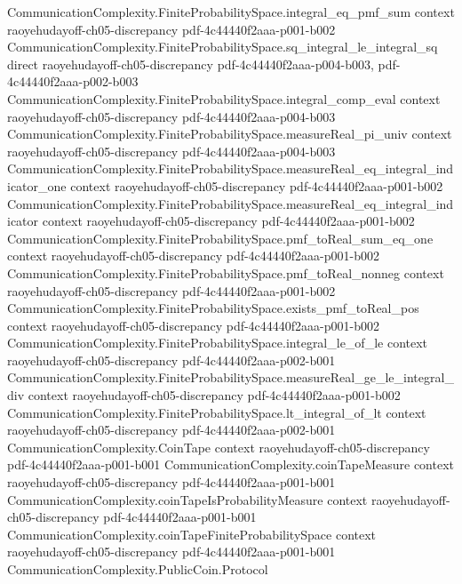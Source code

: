 \begin{lemma}
\proofstep
  {CommunicationComplexity.FiniteProbabilitySpace.integral_eq_pmf_sum}
  {context}
  {raoyehudayoff-ch05-discrepancy}
  {pdf-4c44440f2aaa-p001-b002}
\proofstep
  {CommunicationComplexity.FiniteProbabilitySpace.sq_integral_le_integral_sq}
  {direct}
  {raoyehudayoff-ch05-discrepancy}
  {pdf-4c44440f2aaa-p004-b003,
    pdf-4c44440f2aaa-p002-b003}
\proofstep
  {CommunicationComplexity.FiniteProbabilitySpace.integral_comp_eval}
  {context}
  {raoyehudayoff-ch05-discrepancy}
  {pdf-4c44440f2aaa-p004-b003}
\proofstep
  {CommunicationComplexity.FiniteProbabilitySpace.measureReal_pi_univ}
  {context}
  {raoyehudayoff-ch05-discrepancy}
  {pdf-4c44440f2aaa-p004-b003}
\proofstep
  {CommunicationComplexity.FiniteProbabilitySpace.measureReal_eq_integral_indicator_one}
  {context}
  {raoyehudayoff-ch05-discrepancy}
  {pdf-4c44440f2aaa-p001-b002}
\proofstep
  {CommunicationComplexity.FiniteProbabilitySpace.measureReal_eq_integral_indicator}
  {context}
  {raoyehudayoff-ch05-discrepancy}
  {pdf-4c44440f2aaa-p001-b002}
\proofstep
  {CommunicationComplexity.FiniteProbabilitySpace.pmf_toReal_sum_eq_one}
  {context}
  {raoyehudayoff-ch05-discrepancy}
  {pdf-4c44440f2aaa-p001-b002}
\proofstep
  {CommunicationComplexity.FiniteProbabilitySpace.pmf_toReal_nonneg}
  {context}
  {raoyehudayoff-ch05-discrepancy}
  {pdf-4c44440f2aaa-p001-b002}
\proofstep
  {CommunicationComplexity.FiniteProbabilitySpace.exists_pmf_toReal_pos}
  {context}
  {raoyehudayoff-ch05-discrepancy}
  {pdf-4c44440f2aaa-p001-b002}
\proofstep
  {CommunicationComplexity.FiniteProbabilitySpace.integral_le_of_le}
  {context}
  {raoyehudayoff-ch05-discrepancy}
  {pdf-4c44440f2aaa-p002-b001}
\proofstep
  {CommunicationComplexity.FiniteProbabilitySpace.measureReal_ge_le_integral_div}
  {context}
  {raoyehudayoff-ch05-discrepancy}
  {pdf-4c44440f2aaa-p001-b002}
\proofstep
  {CommunicationComplexity.FiniteProbabilitySpace.lt_integral_of_lt}
  {context}
  {raoyehudayoff-ch05-discrepancy}
  {pdf-4c44440f2aaa-p002-b001}
\proofstep
  {CommunicationComplexity.CoinTape}
  {context}
  {raoyehudayoff-ch05-discrepancy}
  {pdf-4c44440f2aaa-p001-b001}
\proofstep
  {CommunicationComplexity.coinTapeMeasure}
  {context}
  {raoyehudayoff-ch05-discrepancy}
  {pdf-4c44440f2aaa-p001-b001}
\proofstep
  {CommunicationComplexity.coinTapeIsProbabilityMeasure}
  {context}
  {raoyehudayoff-ch05-discrepancy}
  {pdf-4c44440f2aaa-p001-b001}
\proofstep
  {CommunicationComplexity.coinTapeFiniteProbabilitySpace}
  {context}
  {raoyehudayoff-ch05-discrepancy}
  {pdf-4c44440f2aaa-p001-b001}
\proofstep
  {CommunicationComplexity.PublicCoin.Protocol}

\end{lemma}

